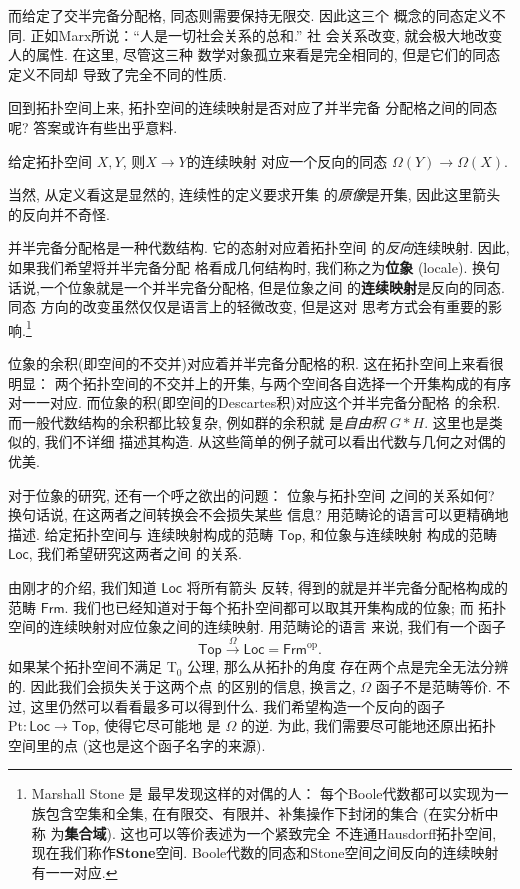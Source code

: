 而给定了交半完备分配格, 同态则需要保持无限交. 因此这三个
概念的同态定义不同. 正如Marx所说：“人是一切社会关系的总和.” 社
会关系改变, 就会极大地改变人的属性. 在这里, 尽管这三种
数学对象孤立来看是完全相同的, 但是它们的同态定义不同却
导致了完全不同的性质.

回到拓扑空间上来, 拓扑空间的连续映射是否对应了并半完备
分配格之间的同态呢? 答案或许有些出乎意料.
\begin{theorem}
给定拓扑空间 \(X, Y\), 则\(X \to Y\)的连续映射
对应一个反向的同态 \(\Omega(Y) \to \Omega(X)\).
\end{theorem}
当然, 从定义看这是显然的, 连续性的定义要求开集
的\emph{原像}是开集, 因此这里箭头的反向并不奇怪.

并半完备分配格是一种代数结构. 它的态射对应着拓扑空间
的\emph{反向}连续映射. 因此, 如果我们希望将并半完备分配
格看成几何结构时, 我们称之为\textbf{位象} (locale).
换句话说,一个位象就是一个并半完备分配格, 但是位象之间
的\textbf{连续映射}是反向的同态. 同态
方向的改变虽然仅仅是语言上的轻微改变, 但是这对
思考方式会有重要的影响.\footnote{Marshall Stone 是
最早发现这样的对偶的人： 每个Boole代数都可以实现为一族包含空集和全集,
在有限交、有限并、补集操作下封闭的集合 (在实分析中称
为\textbf{集合域}). 这也可以等价表述为一个紧致完全
不连通Hausdorff拓扑空间, 现在我们称作\textbf{Stone}空间.
Boole代数的同态和Stone空间之间反向的连续映射有一一对应.}

位象的余积(即空间的不交并)对应着并半完备分配格的积.
这在拓扑空间上来看很明显： 两个拓扑空间的不交并上的开集,
与两个空间各自选择一个开集构成的有序对一一对应.
而位象的积(即空间的Descartes积)对应这个并半完备分配格
的余积. 而一般代数结构的余积都比较复杂, 例如群的余积就
是\emph{自由积} \(G * H\). 这里也是类似的, 我们不详细
描述其构造. 从这些简单的例子就可以看出代数与几何之对偶的
优美.

对于位象的研究, 还有一个呼之欲出的问题： 位象与拓扑空间
之间的关系如何? 换句话说, 在这两者之间转换会不会损失某些
信息? 用范畴论的语言可以更精确地描述. 给定拓扑空间与
连续映射构成的范畴 \(\mathsf{Top}\), 和位象与连续映射
构成的范畴 \(\mathsf{Loc}\), 我们希望研究这两者之间
的关系.

由刚才的介绍, 我们知道 \(\mathsf{Loc}\) 将所有箭头
反转, 得到的就是并半完备分配格构成的范畴 \(\mathsf{Frm}\).
我们也已经知道对于每个拓扑空间都可以取其开集构成的位象; 而
拓扑空间的连续映射对应位象之间的连续映射. 用范畴论的语言
来说, 我们有一个函子
\[\mathsf{Top} \xrightarrow{\Omega} \mathsf{Loc}
= \mathsf{Frm}^{\mathrm{op}}.\]
如果某个拓扑空间不满足 T\(_0\) 公理, 那么从拓扑的角度
存在两个点是完全无法分辨的. 因此我们会损失关于这两个点
的区别的信息, 换言之, \(\Omega\) 函子不是范畴等价.
不过, 这里仍然可以看看最多可以得到什么.
我们希望构造一个反向的函子 \(\mathrm{Pt} :
\mathsf{Loc} \to \mathsf{Top}\), 使得它尽可能地
是 \(\Omega\) 的逆. 为此, 我们需要尽可能地还原出拓扑
空间里的点 (这也是这个函子名字的来源).


